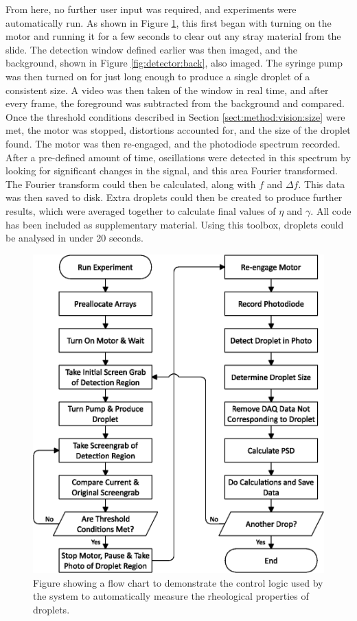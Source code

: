 \documentclass{physics_article_B}
\begin{document}
        \newpage From here, no further user input was required, and experiments were automatically run. As shown in Figure \ref{fig:setup:logic}, this first began with turning on the motor and running it for a few seconds to clear out any stray material from the slide. The detection window defined earlier was then imaged, and the background, shown in Figure \ref{fig:detector:back}, also imaged. The syringe pump was then turned on for just long enough to produce a single droplet of a consistent size. A video was then taken of the window in real time, and after every frame, the foreground was subtracted from the background and compared. Once the threshold conditions described in Section \ref{sect:method:vision:size} were met, the motor was stopped, distortions accounted for, and the size of the droplet found. The motor was then re-engaged, and the photodiode spectrum recorded. After a pre-defined amount of time, oscillations were detected in this spectrum by looking for significant changes in the signal, and this area Fourier transformed. The Fourier transform could then be calculated, along with $f$ and $\Delta f$. This data was then saved to disk. Extra droplets could then be created to produce further results, which were averaged together to calculate final values of $\eta$ and $\gamma$. All code has been included as supplementary material. Using this toolbox, droplets could be analysed in under 20 seconds.
    
            \vspace{0.5cm}\begin{figure}[H]
                \centering
                \hspace*{-1cm}\includegraphics[scale=0.8]{Figures/FlowLogic.eps}
                \caption{Figure showing a flow chart to demonstrate the control logic used by the system to automatically measure the rheological properties of droplets.}
                \label{fig:setup:logic}
            \end{figure}
\end{document}
